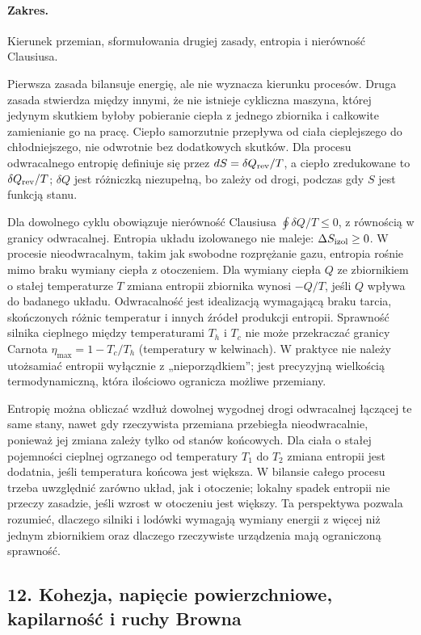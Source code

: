 \documentclass[11pt,a4paper]{article}
\begin{document}
\paragraph{Zakres.} Kierunek przemian, sformułowania drugiej zasady, entropia i nierówność Clausiusa.

Pierwsza zasada bilansuje energię, ale nie wyznacza kierunku procesów. Druga zasada stwierdza między innymi, że nie istnieje cykliczna maszyna, której jedynym skutkiem byłoby pobieranie ciepła z jednego zbiornika i całkowite zamienianie go na pracę. Ciepło samorzutnie przepływa od ciała cieplejszego do chłodniejszego, nie odwrotnie bez dodatkowych skutków. Dla procesu odwracalnego entropię definiuje się przez $dS=\delta Q_{\rm rev}/T$, a ciepło zredukowane to $\delta Q_{\rm rev}/T$; $\delta Q$ jest różniczką niezupełną, bo zależy od drogi, podczas gdy $S$ jest funkcją stanu.

Dla dowolnego cyklu obowiązuje nierówność Clausiusa $\oint \delta Q/T\leq0$, z równością w granicy odwracalnej. Entropia układu izolowanego nie maleje: $\Delta S_{\rm izol}\geq0$. W procesie nieodwracalnym, takim jak swobodne rozprężanie gazu, entropia rośnie mimo braku wymiany ciepła z otoczeniem. Dla wymiany ciepła $Q$ ze zbiornikiem o stałej temperaturze $T$ zmiana entropii zbiornika wynosi $-Q/T$, jeśli $Q$ wpływa do badanego układu. Odwracalność jest idealizacją wymagającą braku tarcia, skończonych różnic temperatur i innych źródeł produkcji entropii. Sprawność silnika cieplnego między temperaturami $T_h$ i $T_c$ nie może przekraczać granicy Carnota $\eta_{\max}=1-T_c/T_h$ (temperatury w kelwinach). W praktyce nie należy utożsamiać entropii wyłącznie z „nieporządkiem”; jest precyzyjną wielkością termodynamiczną, która ilościowo ogranicza możliwe przemiany.

Entropię można obliczać wzdłuż dowolnej wygodnej drogi odwracalnej łączącej te same stany, nawet gdy rzeczywista przemiana przebiegła nieodwracalnie, ponieważ jej zmiana zależy tylko od stanów końcowych. Dla ciała o stałej pojemności cieplnej ogrzanego od temperatury $T_1$ do $T_2$ zmiana entropii jest dodatnia, jeśli temperatura końcowa jest większa. W bilansie całego procesu trzeba uwzględnić zarówno układ, jak i otoczenie; lokalny spadek entropii nie przeczy zasadzie, jeśli wzrost w otoczeniu jest większy. Ta perspektywa pozwala rozumieć, dlaczego silniki i lodówki wymagają wymiany energii z więcej niż jednym zbiornikiem oraz dlaczego rzeczywiste urządzenia mają ograniczoną sprawność.

\subsection{12. Kohezja, napięcie powierzchniowe, kapilarność i ruchy Browna}
\end{document}
